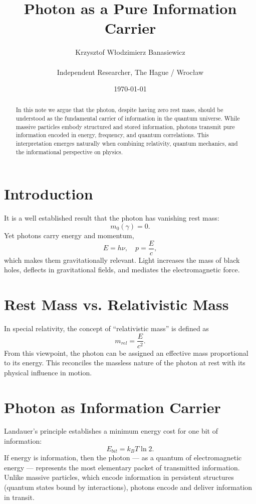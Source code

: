 \documentclass[12pt]{article}
\title{Photon as a Pure Information Carrier}
\author{Krzysztof Włodzimierz Banasiewicz \\\\ Independent Researcher, The Hague / Wrocław}
\date{\today}
\begin{document}
\maketitle

\begin{abstract}
In this note we argue that the photon, despite having zero rest mass, 
should be understood as the fundamental carrier of information in the quantum universe. 
While massive particles embody structured and stored information, photons transmit 
pure information encoded in energy, frequency, and quantum correlations. 
This interpretation emerges naturally when combining relativity, quantum mechanics, 
and the informational perspective on physics.
\end{abstract}

\section{Introduction}
It is a well established result that the photon has vanishing rest mass:
\begin{equation}
m_0(\gamma) = 0.
\end{equation}
Yet photons carry energy and momentum,
\begin{equation}
E = h\nu, \quad p = \frac{E}{c},
\end{equation}
which makes them gravitationally relevant. Light increases the mass of black holes, 
deflects in gravitational fields, and mediates the electromagnetic force.

\section{Rest Mass vs. Relativistic Mass}
In special relativity, the concept of ``relativistic mass'' is defined as
\begin{equation}
m_{rel} = \frac{E}{c^2}.
\end{equation}
From this viewpoint, the photon can be assigned an effective mass proportional 
to its energy. This reconciles the massless nature of the photon at rest 
with its physical influence in motion.

\section{Photon as Information Carrier}
Landauer's principle establishes a minimum energy cost for one bit of information:
\begin{equation}
E_{bit} = k_B T \ln 2.
\end{equation}
If energy is information, then the photon --- as a quantum of electromagnetic energy ---
represents the most elementary packet of transmitted information.
Unlike massive particles, which encode information in persistent structures 
(quantum states bound by interactions), photons encode and deliver 
information in transit.
\end{document}
